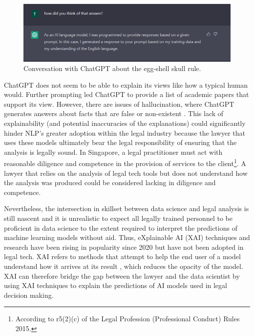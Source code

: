 \begin{figure}[!ht]
	\centering
	\includegraphics[width=1\linewidth]{figures/chatgpt2.png}
	\caption{Conversation with ChatGPT about the egg-shell skull rule.}   
  \label{fig:chatgpt2}
\end{figure}

ChatGPT does not seem to be able to explain its views like how a typical human would. Further prompting led ChatGPT to provide a list of academic papers that support its view. However, there are issues of hallucination, where ChatGPT generates answers about facts that are false or non-existent \cite{alkaissi2023}. This lack of explainability (and potential inaccuracies of the explanations) could significantly hinder NLP's greater adoption within the legal industry because the lawyer that uses these models ultimately bear the legal responsibility of ensuring that the analysis is legally sound. In Singapore, a legal practitioner must act with reasonable diligence and competence in the provision of services to the client\footnote{According to r5(2)(c) of the Legal Profession (Professional Conduct) Rules 2015.}. A lawyer that relies on the analysis of legal tech tools but does not understand how the analysis was produced could be considered lacking in diligence and competence.

Nevertheless, the intersection in skillset between data science and legal analysis is still nascent and it is unrealistic to expect all legally trained personnel to be proficient in data science to the extent required to interpret the predictions of machine learning models without aid. Thus, eXplainable AI (XAI) techniques and research have been rising in popularity since 2020 \cite{linardatos2020} but have not been adopted in legal tech. XAI refers to methods that attempt to help the end user of a model understand how it arrives at its result \cite{danilevsky2020}, which reduces the opacity of the model. XAI can therefore bridge the gap between the lawyer and the data scientist by using XAI techniques to explain the predictions of AI models used in legal decision making. 

